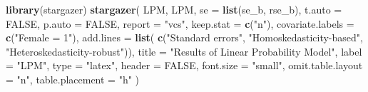 \documentclass[
  12pt,
]{article}
\newenvironment{Shaded}{\begin{snugshade}}{\end{snugshade}}
\newcommand{\DataTypeTok}[1]{\textcolor[rgb]{0.13,0.29,0.53}{#1}}
\newcommand{\KeywordTok}[1]{\textcolor[rgb]{0.13,0.29,0.53}{\textbf{#1}}}
\newcommand{\NormalTok}[1]{#1}
\newcommand{\OtherTok}[1]{\textcolor[rgb]{0.56,0.35,0.01}{#1}}
\newcommand{\StringTok}[1]{\textcolor[rgb]{0.31,0.60,0.02}{#1}}
\begin{document}
\begin{Shaded}
\begin{Highlighting}[]
\KeywordTok{library}\NormalTok{(stargazer)}
\KeywordTok{stargazer}\NormalTok{(}
\NormalTok{  LPM, LPM,}
  \DataTypeTok{se =} \KeywordTok{list}\NormalTok{(se\_b, rse\_b),}
  \DataTypeTok{t.auto =} \OtherTok{FALSE}\NormalTok{, }\DataTypeTok{p.auto =} \OtherTok{FALSE}\NormalTok{,}
  \DataTypeTok{report =} \StringTok{"vcs"}\NormalTok{, }\DataTypeTok{keep.stat =} \KeywordTok{c}\NormalTok{(}\StringTok{"n"}\NormalTok{),}
  \DataTypeTok{covariate.labels =} \KeywordTok{c}\NormalTok{(}\StringTok{"Female = 1"}\NormalTok{),}
  \DataTypeTok{add.lines =} \KeywordTok{list}\NormalTok{(}
    \KeywordTok{c}\NormalTok{(}\StringTok{"Standard errors"}\NormalTok{, }\StringTok{"Homoskedasticity{-}based"}\NormalTok{, }\StringTok{"Heteroskedasticity{-}robust"}\NormalTok{)),}
  \DataTypeTok{title =} \StringTok{"Results of Linear Probability Model"}\NormalTok{, }\DataTypeTok{label =} \StringTok{"LPM"}\NormalTok{,}
  \DataTypeTok{type =} \StringTok{"latex"}\NormalTok{, }\DataTypeTok{header =} \OtherTok{FALSE}\NormalTok{, }\DataTypeTok{font.size =} \StringTok{"small"}\NormalTok{,}
  \DataTypeTok{omit.table.layout =} \StringTok{"n"}\NormalTok{, }\DataTypeTok{table.placement =} \StringTok{"h"}
\NormalTok{)}
\end{Highlighting}
\end{Shaded}
\end{document}
